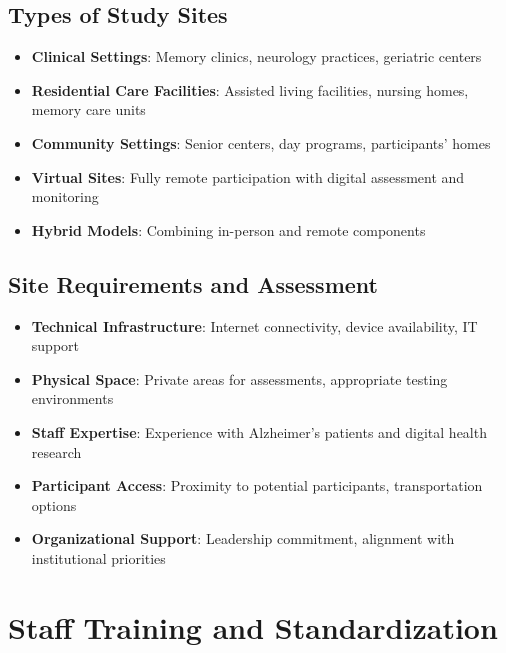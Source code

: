 \subsection{Types of Study Sites}
\begin{itemize}
    \item \textbf{Clinical Settings}: Memory clinics, neurology practices, geriatric centers
    
    \item \textbf{Residential Care Facilities}: Assisted living facilities, nursing homes, memory care units
    
    \item \textbf{Community Settings}: Senior centers, day programs, participants' homes
    
    \item \textbf{Virtual Sites}: Fully remote participation with digital assessment and monitoring
    
    \item \textbf{Hybrid Models}: Combining in-person and remote components
\end{itemize}

\subsection{Site Requirements and Assessment}
\begin{itemize}
    \item \textbf{Technical Infrastructure}: Internet connectivity, device availability, IT support
    
    \item \textbf{Physical Space}: Private areas for assessments, appropriate testing environments
    
    \item \textbf{Staff Expertise}: Experience with Alzheimer's patients and digital health research
    
    \item \textbf{Participant Access}: Proximity to potential participants, transportation options
    
    \item \textbf{Organizational Support}: Leadership commitment, alignment with institutional priorities
\end{itemize}

\section{Staff Training and Standardization}
